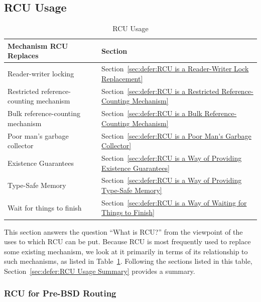 
\subsection{RCU Usage}
\label{sec:defer:RCU Usage}

\begin{table}[tb]
\centering
\scriptsize
\begin{tabular}{l|l}
Mechanism RCU Replaces & Section \\
\hline
\hline
Reader-writer locking &
	Section~\ref{sec:defer:RCU is a Reader-Writer Lock Replacement} \\
Restricted reference-counting mechanism &
	Section~\ref{sec:defer:RCU is a Restricted Reference-Counting Mechanism} \\
Bulk reference-counting mechanism &
	Section~\ref{sec:defer:RCU is a Bulk Reference-Counting Mechanism} \\
Poor man's garbage collector &
	Section~\ref{sec:defer:RCU is a Poor Man's Garbage Collector} \\
Existence Guarantees &
	Section~\ref{sec:defer:RCU is a Way of Providing Existence Guarantees} \\
Type-Safe Memory &
	Section~\ref{sec:defer:RCU is a Way of Providing Type-Safe Memory} \\
Wait for things to finish &
	Section~\ref{sec:defer:RCU is a Way of Waiting for Things to Finish} \\
\end{tabular}
\caption{RCU Usage}
\label{tab:defer:RCU Usage}
\end{table}

This section answers the question ``What is RCU?'' from the viewpoint
of the uses to which RCU can be put.
Because RCU is most frequently used to replace some existing mechanism,
we look at it primarily in terms of its relationship to such mechanisms,
as listed in Table~\ref{tab:defer:RCU Usage}.
Following the sections listed in this table,
Section~\ref{sec:defer:RCU Usage Summary} provides a summary.

\subsubsection{RCU for Pre-BSD Routing}
\label{sec:defer:RCU for Pre-BSD Routing}

